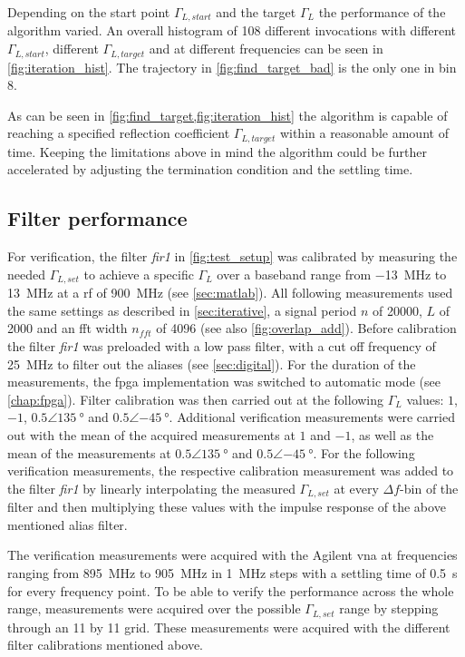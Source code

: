 \documentclass[12pt,a4paper,parskip=full,abstract=true,BCOR=12mm,twoside,open=right]{scrreprt}
\def\device#1{\textit{#1}}
\begin{document}
Depending on the start point $\Gamma_{L,start}$ and the target $\Gamma_{L}$
the performance of the algorithm varied. An overall histogram of 108 different
invocations with different $\Gamma_{L,start}$, different $\Gamma_{L,target}$ and
at different frequencies can be seen in \cref{fig:iteration_hist}. The trajectory
in \cref{fig:find_target_bad} is the only one in bin 8.

As can be seen in \cref{fig:find_target,fig:iteration_hist} the algorithm is capable
of reaching a specified reflection coefficient $\Gamma_{L,target}$ within a reasonable
amount of time. Keeping the limitations above in mind the algorithm could be further
accelerated by adjusting the termination condition and the settling time.

\subsection{Filter performance}
\label{sec:filter}

For verification, the filter \device{fir1} in \cref{fig:test_setup} was calibrated
by measuring the needed $\Gamma_{L,set}$ to achieve a specific $\Gamma_L$ over a
baseband range from \SI{-13}{\mega\hertz} to \SI{13}{\mega\hertz} at a \gls{rf} of
\SI{900}{\mega\hertz} (see \cref{sec:matlab}). All following
measurements used the same settings as described in \cref{sec:iterative}, a signal period $n$ of 20000,
$L$ of 2000 and an \gls{fft} width $n_{fft}$ of 4096 (see also \cref{fig:overlap_add}).
Before calibration the filter \device{fir1} was preloaded with a low pass filter, with
a cut off frequency of \SI{25}{\mega\hertz} to filter out the aliases (see
\cref{sec:digital}). For the duration of the measurements, the \gls{fpga} implementation
was switched to automatic mode (see \cref{chap:fpga}). Filter calibration was then carried out at the following $\Gamma_L$
values: $1$, $-1$, $0.5\angle\SI{135}{\degree}$ and $0.5\angle\SI{-45}{\degree}$. Additional
verification measurements were carried out with the mean of the acquired measurements
at $1$ and $-1$, as well as the mean of the measurements at $0.5\angle\SI{135}{\degree}$
and $0.5\angle\SI{-45}{\degree}$. For the following verification measurements, the respective
calibration measurement was added to the filter \device{fir1} by linearly interpolating
the measured $\Gamma_{L,set}$ at every $\Delta{}f$-bin of the filter and then multiplying
these values with the impulse response of the above mentioned alias filter.

The verification measurements were acquired with the Agilent \gls{vna} at frequencies
ranging from \SI{895}{\mega\hertz} to \SI{905}{\mega\hertz} in \SI{1}{\mega\hertz} steps
with a settling time of \SI{0.5}{\second} for every frequency point. To be able to verify
the performance across the whole range, measurements were acquired over the possible
$\Gamma_{L,set}$ range by stepping through an 11 by 11 grid. These measurements were
acquired with the different filter calibrations mentioned above.
\end{document}
